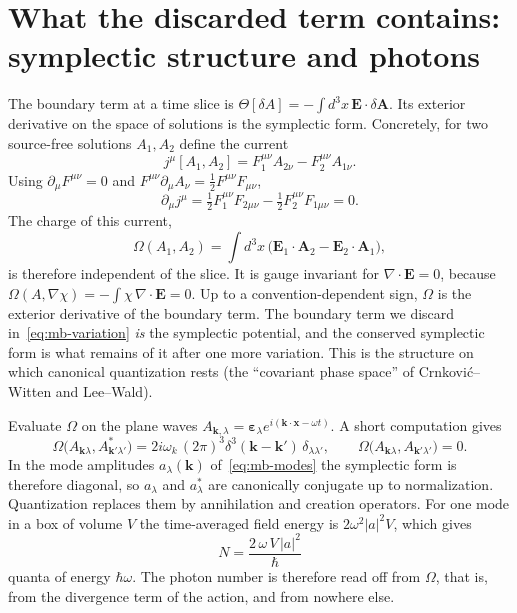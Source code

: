 \section[The discarded term: symplectic structure]{What the discarded term contains: symplectic structure and photons}
\label{sec:mb-symplectic}

The boundary term at a time slice is
$\Theta[\delta A]=-\int d^3x\,\mathbf E\cdot\delta\mathbf A$. Its exterior
derivative on the space of solutions is the symplectic form. Concretely,
for two source-free solutions $A_1,A_2$ define the current
\begin{equation}
j^\mu[A_1,A_2]=F_1^{\mu\nu}A_{2\nu}-F_2^{\mu\nu}A_{1\nu}.
\end{equation}
Using $\partial_\mu F^{\mu\nu}=0$ and $F^{\mu\nu}\partial_\mu A_\nu=\tfrac12F^{\mu\nu}F_{\mu\nu}$,
\begin{equation}
\partial_\mu j^\mu=\tfrac12F_1^{\mu\nu}F_{2\mu\nu}-\tfrac12F_2^{\mu\nu}F_{1\mu\nu}=0 .
\end{equation}
The charge of this current,
\begin{equation}
\Omega(A_1,A_2)=\int d^3x\,\big(\mathbf E_1\cdot\mathbf A_2-\mathbf E_2\cdot\mathbf A_1\big),
\label{eq:mb-symplectic}
\end{equation}
is therefore independent of the slice. It is gauge invariant for
$\nabla\cdot\mathbf E=0$, because $\Omega(A,\nabla\chi)=-\int\chi\,\nabla\cdot\mathbf E=0$.
Up to a convention-dependent sign, $\Omega$ is the exterior derivative of
the boundary term. The boundary term we discard in~\eqref{eq:mb-variation}
\emph{is} the symplectic potential, and the conserved symplectic form is
what remains of it after one more variation. This is the structure on which
canonical quantization rests (the ``covariant phase space'' of Crnkovi\'c--Witten
and Lee--Wald).

Evaluate $\Omega$ on the plane waves $A_{\mathbf k,\lambda}=\boldsymbol\varepsilon_\lambda e^{i(\mathbf k\cdot\mathbf x-\omega t)}$.
A short computation gives
\begin{equation}
\Omega\big(A_{\mathbf k\lambda},A^{*}_{\mathbf k'\lambda'}\big)
=2i\omega_k\,(2\pi)^3\delta^3(\mathbf k-\mathbf k')\,\delta_{\lambda\lambda'},
\qquad
\Omega\big(A_{\mathbf k\lambda},A_{\mathbf k'\lambda'}\big)=0 .
\end{equation}
In the mode amplitudes $a_\lambda(\mathbf k)$ of~\eqref{eq:mb-modes} the
symplectic form is therefore diagonal, so $a_\lambda$ and $a_\lambda^*$ are
canonically conjugate up to normalization. Quantization replaces them by
annihilation and creation operators. For one mode in a box of volume $V$
the time-averaged field energy is $2\omega^2|a|^2V$, which gives
\begin{equation}
N=\frac{2\,\omega\,V\,|a|^2}{\hbar}
\end{equation}
quanta of energy $\hbar\omega$. The photon number is therefore read off
from $\Omega$, that is, from the divergence term of the action, and from
nowhere else.

